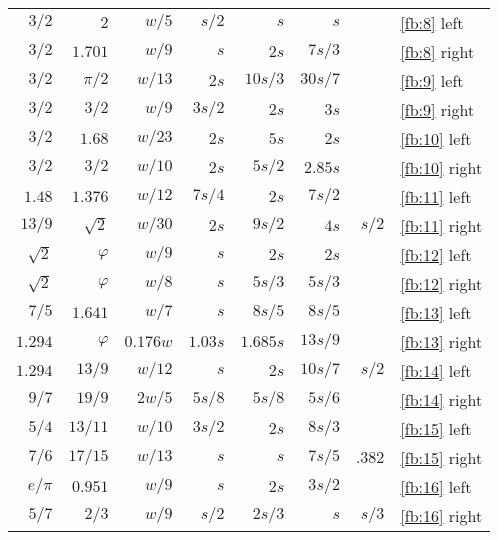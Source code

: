 \documentclass[10pt,letterpaper]{memoir}
\begin{document}
\begin{table}
\begin{tabular}{|r|r|rrrrr|l|}
$3/2$      & $2$     & $w/5$    & $s/2$  & $s$     & $s$     &       & \ref{fb:8} left \\ %
$3/2$      & $1.701$ & $w/9$    & $s$    & $2s$    & $7s/3$  &       & \ref{fb:8} right \\ %
$3/2$      & $\pi/2$ & $w/13$   & $2s$   & $10s/3$ & $30s/7$ &       & \ref{fb:9} left \\ %
$3/2$      & $3/2$   & $w/9$    & $3s/2$ & $2s$    & $3s$    &       & \ref{fb:9} right \\ %
$3/2$      & $1.68$  & $w/23$   & $2s$   & $5s$    & $2s$    &       & \ref{fb:10} left \\ %
$3/2$      & $3/2$   & $w/10$   & $2s$   & $5s/2$  & $2.85s$ &       & \ref{fb:10} right \\ %
$1.48$     & $1.376$ & $w/12$   & $7s/4$ & $2s$    & $7s/2$  &       & \ref{fb:11} left \\ %
$13/9$     & $\sqrt{2}$ & $w/30$ & $2s$  & $9s/2$  & $4s$    & $s/2$ & \ref{fb:11} right \\ %
$\sqrt{2}$ & $\varphi$ & $w/9$  & $s$    & $2s$    & $2s$    &       & \ref{fb:12} left \\ %
$\sqrt{2}$ & $\varphi$ & $w/8$  & $s$    & $5s/3$  & $5s/3$  &       & \ref{fb:12} right \\ %
$7/5$      & $1.641$   & $w/7$  & $s$    & $8s/5$  & $8s/5$  &       & \ref{fb:13} left \\ %
$1.294$    & $\varphi$ & $0.176w$ & $1.03s$ & $1.685s$ & $13s/9$ &   & \ref{fb:13} right \\ %
$1.294$    & $13/9$  & $w/12$   & $s$    & $2s$    & $10s/7$ & $s/2$ & \ref{fb:14} left \\ %
$9/7$      & $19/9$  & $2w/5$   & $5s/8$ & $5s/8$  & $5s/6$  &       & \ref{fb:14} right \\ %
$5/4$      & $13/11$ & $w/10$   & $3s/2$ & $2s$    & $8s/3$  &       & \ref{fb:15} left \\ %
$7/6$    & $17/15$ & $w/13$   & $s$    & $s$     & $7s/5$  & $.382$ & \ref{fb:15} right \\ %
$e/\pi$    & $0.951$ & $w/9$    & $s$    & $2s$    & $3s/2$  &       & \ref{fb:16} left \\ %
$5/7$      & $2/3$   & $w/9$    & $s/2$  & $2s/3$  & $s$     & $s/3$ & \ref{fb:16} right \\ \hline %
\end{tabular}
\MakeShortVerb{\|}
\end{table}
\end{document}
